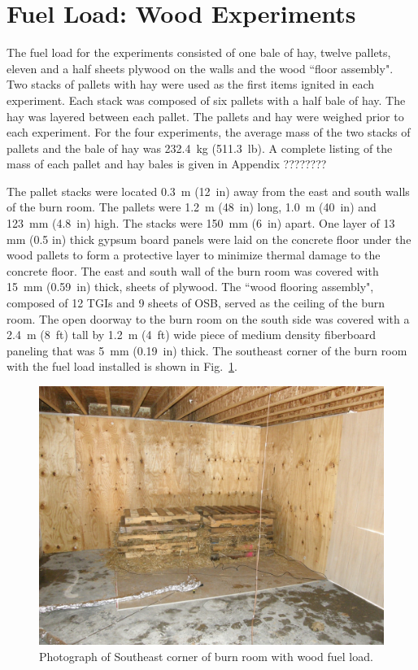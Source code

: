 \documentclass[12pt,oneside]{book}
\begin{document}
\section{Fuel Load: Wood Experiments}
\label{sec:Fuel_Load:_Wood_Experiments} 

The fuel load for the experiments consisted of one bale of hay, twelve pallets, eleven and a half sheets plywood on the walls and the wood ``floor assembly". Two stacks of pallets with hay were used as the first items ignited in each experiment.  Each stack was composed of six pallets with a half bale of hay.  The hay was layered between each pallet.  The pallets and hay were weighed prior to each experiment.  For the four experiments, the average mass of the two stacks of pallets and the bale of hay was 232.4~kg (511.3~lb).  A complete listing of the mass of each pallet and hay bales is given in Appendix ????????
  
The pallet stacks were located 0.3~m (12~in) away from the east and south walls of the burn room.  The pallets were 1.2~m (48~in) long, 1.0~m (40~in) and 123~mm (4.8~in) high.  The stacks were 150~mm (6~in) apart.  One layer of 13 mm (0.5 in) thick gypsum board panels were laid on the concrete floor under the wood pallets to form a protective layer to minimize thermal damage to the concrete floor.
The east and south wall of the burn room was covered with 15~mm (0.59~in) thick, sheets of plywood.  The ``wood flooring assembly", composed of 12 TGIs and 9 sheets of OSB, served as the ceiling of the burn room.  The open doorway to the burn room on the south side was covered with a 2.4~m (8~ft) tall by 1.2~m (4~ft) wide piece of medium density fiberboard paneling that was 5~mm (0.19~in) thick.  The southeast corner of the burn room with the fuel load installed is shown in Fig.~\ref{fig:Wood_Fuel_Load}.

\begin{figure}[!ht]
	\includegraphics[width=6in]{../Figures/Pictures/Wood_Fuel_Package}
	\caption{Photograph of Southeast corner of burn room with wood fuel load.}
	\label{fig:Wood_Fuel_Load}
\end{figure}
\end{document}
